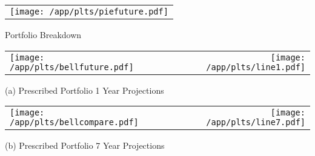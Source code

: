 \documentclass{article}
\begin{document}
\begin{adjustwidth}{-.3in}{0in}%
\vspace*{-1cm}

\begin{center}
  \begin{tabular}{c}
    \texttt{[image: /app/plts/piefuture.pdf]}
  \end{tabular}
  \end{center}

  \begin{center}
        Portfolio Breakdown
  \end{center}

\vspace{.7cm}


\begin{center}
  \begin{tabular}{lcr}
  \texttt{[image: /app/plts/bellfuture.pdf]}
    & \hspace{1cm }&\texttt{[image: /app/plts/line1.pdf]}
  \end{tabular}
  \end{center}

  \begin{center}
      (a) Prescribed Portfolio 1 Year Projections
  \end{center}

  \vspace{.7cm}


\begin{center}
  \begin{tabular}{lcr}
  \texttt{[image: /app/plts/bellcompare.pdf]}
    & \hspace{1cm }&\texttt{[image: /app/plts/line7.pdf]}
  \end{tabular}
  \end{center}

  \begin{center}
      (b) Prescribed Portfolio 7 Year Projections
  \end{center}

\vspace{.6cm}

\end{adjustwidth}
\end{document}

